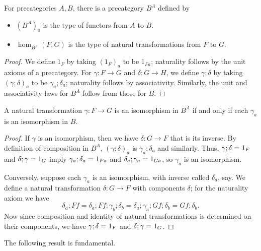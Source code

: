 \begin{defn}\label{ct:functor-precat}
  For precategories $A,B$, there is a precategory $B^A$ defined by
  \begin{itemize}
  \item $(B^A)_0$ is the type of functors from $A$ to $B$.
  \item $\hom_{B^A}(F,G)$ is the type of natural transformations from $F$ to $G$.
  \end{itemize}
\end{defn}
\begin{proof}
  We define $1_F$ by taking $(1_F)_a$ to be $1_{Fa}$; naturality follows by the unit axioms of a precategory.  For $\gamma:F\to G$ and $\delta:G\to H$, we define $\gamma;\delta$ by taking $(\gamma;\delta)_a$ to be $\gamma_a;\delta_a$; naturality follows by associativity.
  Similarly, the unit and associativity laws for $B^A$ follow from those for $B$.
\end{proof}

\begin{lem}\label{ct:natiso}
  A natural transformation $\gamma:F\to G$ is an isomorphism in $B^A$ if and only if each $\gamma_a$ is an isomorphism in $B$.
\end{lem}
\begin{proof}
  If $\gamma$ is an isomorphism, then we have $\delta:G\to F$ that is its inverse.  By definition of composition in $B^A$, $(\gamma;\delta)_a$ is $\gamma_a;\delta_a$ and similarly.  Thus, $\gamma;\delta =_{} 1_F$ and $\delta;\gamma =_{} 1_G$ imply $\gamma_a;\delta_a =_{} 1_{Fa}$ and $\delta_a;\gamma_a =_{} 1_{Ga}$, so $\gamma_a$ is an isomorphism.

  Conversely, suppose each $\gamma_a$ is an isomorphism, with inverse called $\delta_a$, say.  We define a natural transformation $\delta:G\to F$ with components $\delta$; for the naturality axiom we have
  \[ \delta_a;Ff = \delta_a;Ff;\gamma_b;\delta_b = \delta_a;\gamma_a;Gf;\delta_b = Gf;\delta_b. \]
  Now since composition and identity of natural transformations is determined on their components, we have $\gamma;\delta =_{} 1_F$ and $\delta;\gamma =_{} 1_G$.
\end{proof}

The following result is fundamental.

